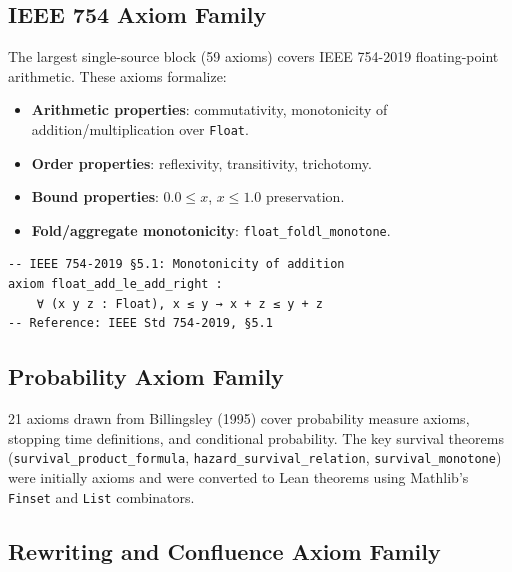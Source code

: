 \subsection{IEEE 754 Axiom Family}

The largest single-source block (59 axioms) covers IEEE 754-2019 floating-point
arithmetic. These axioms formalize:

\begin{itemize}
  \item \textbf{Arithmetic properties}: commutativity, monotonicity of
        addition/multiplication over \texttt{Float}.
  \item \textbf{Order properties}: reflexivity, transitivity, trichotomy.
  \item \textbf{Bound properties}: $0.0 \leq x$, $x \leq 1.0$ preservation.
  \item \textbf{Fold/aggregate monotonicity}: \texttt{float\_foldl\_monotone}.
\end{itemize}

\begin{lstlisting}
-- IEEE 754-2019 §5.1: Monotonicity of addition
axiom float_add_le_add_right :
    ∀ (x y z : Float), x ≤ y → x + z ≤ y + z
-- Reference: IEEE Std 754-2019, §5.1
\end{lstlisting}

\subsection{Probability Axiom Family}

21 axioms drawn from Billingsley (1995) cover probability measure axioms,
stopping time definitions, and conditional probability. The key survival theorems
(\texttt{survival\_product\_formula}, \texttt{hazard\_survival\_relation},
\texttt{survival\_monotone}) were initially axioms and were converted to Lean
theorems using Mathlib's \texttt{Finset} and \texttt{List} combinators.

\subsection{Rewriting and Confluence Axiom Family}

